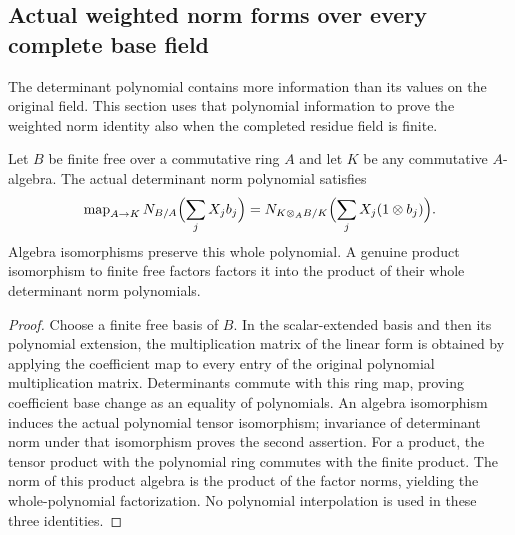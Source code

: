 \subsection{Actual weighted norm forms over every complete base field}
\label{subsec:general-weighted-norms}

The determinant polynomial contains more information than its values on the
original field. This section uses that polynomial information to prove the
weighted norm identity also when the completed residue field is finite.

\begin{lemma}
\label{spectrum:whole-norm-form-base-change}
\leanok
{}
Let $B$ be finite free over a commutative ring $A$ and let $K$ be any
commutative $A$-algebra. The actual determinant norm polynomial satisfies
\[
 \operatorname{map}_{A\to K}N_{B/A}\Bigl(\sum_j X_jb_j\Bigr)
 =N_{K\otimes_A B/K}\Bigl(\sum_j X_j(1\otimes b_j)\Bigr).
\]
Algebra isomorphisms preserve this whole polynomial. A genuine product
isomorphism to finite free factors factors it into the product of their
whole determinant norm polynomials.
\end{lemma}
\begin{proof}
Choose a finite free basis of $B$. In the scalar-extended basis and then its
polynomial extension, the multiplication matrix of the linear form is
obtained by applying the coefficient map to every entry of the original
polynomial multiplication matrix. Determinants commute with this ring map,
proving coefficient base change as an equality of polynomials.
An algebra isomorphism induces the actual polynomial tensor isomorphism;
invariance of determinant norm under that isomorphism proves the second
assertion. For a product, the tensor product with the polynomial ring
commutes with the finite product. The norm of this product algebra is the
product of the factor norms, yielding the whole-polynomial factorization.
No polynomial interpolation is used in these three identities.
\end{proof}

